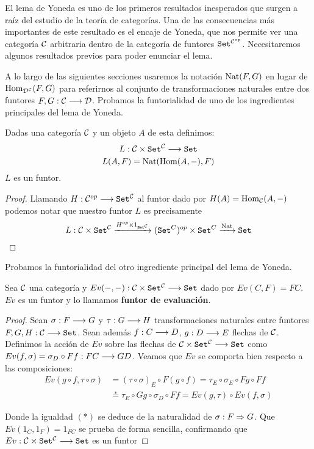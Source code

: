 El lema de Yoneda es uno de los primeros resultados
inesperados que surgen a raíz del
estudio de la teoría de categorías. Una
de las consecuencias más importantes de este resultado es
el encaje de Yoneda, que nos permite
ver una categoría $\mathcal{C}$ arbitraria dentro de la categoría de
funtores $\texttt{Set}^{\mathcal{C}^{op}}$. Necesitaremos algunos resultados
previos para poder enunciar el lema.

A lo largo de las siguientes
secciones usaremos la notación $\operatorname{Nat}(F, G)$ en lugar de
$\operatorname{Hom}_{\mathcal{D}^{\mathcal{C}}}(F, G)$ para referirnos al conjunto de
transformaciones naturales entre dos funtores
$F, G: \mathcal{C}\longrightarrow \mathcal{D}$. Probamos la funtorialidad de uno de los
ingredientes principales del lema de Yoneda.
\begin{proposition*}
  Dadas una categoría $\mathcal{C}$ y un objeto $A$ de esta definimos:
  $$L : \mathcal{C}\times\texttt{Set}^{\mathcal{C}}\longrightarrow \texttt{Set}$$
  $$L(A, F) = \operatorname{Nat}(\operatorname{Hom}(A, -), F)$$
  $L$ es un funtor.
\end{proposition*}
\begin{proof}
  Llamando
  $H: \mathcal{C}^{op}\longrightarrow \texttt{Set}^{\mathcal{C}}$ al funtor dado por
  $H(A) = \operatorname{Hom}_{\mathcal{C}}(A, -)$
  podemos notar que nuestro funtor $L$ es precisamente
  $$L :\mathcal{C}\times\texttt{Set}^{\mathcal{C}}
  \xrightarrow{H^{op}\times 1_{\texttt{Set}^{\mathcal{C}}}}
  (\texttt{Set}^{C})^{op} \times \texttt{Set}^{C}
  \xrightarrow{\operatorname{Nat}} \texttt{Set}$$
\end{proof}
Probamos la funtorialidad
del otro ingrediente principal del lema de Yoneda.
\begin{proposition*}
  Sea $\mathcal{C}$ una categoría y $Ev(-, -) : \mathcal{C}\times\texttt{Set}^{\mathcal{C}}\longrightarrow \texttt{Set}$
  dado por $Ev(C, F) = FC$. $Ev$ es un funtor y lo llamamos
  \textbf{funtor de evaluación}.
\end{proposition*}
\begin{proof}
  Sean $\sigma : F\longrightarrow G$ y $\tau : G\longrightarrow H$ transformaciones naturales entre funtores
  $F, G, H : \mathcal{C}\longrightarrow \texttt{Set}$. Sean además $f : C\longrightarrow D$,
  $g : D\longrightarrow E$ flechas de $\mathcal{C}$.
  Definimos la acción de $Ev$ sobre las flechas de
  $\mathcal{C}\times\texttt{Set}^{\mathcal{C}}\longrightarrow \texttt{Set}$ como
  $Ev(f, \sigma) = \sigma_D \circ Ff : FC\longrightarrow GD$. Veamos que $Ev$ se comporta bien
  respecto a las composiciones:
  \begin{align*}
    Ev(g \circ f, \tau\circ\sigma) &
     = (\tau \circ \sigma)_E\circ F(g\circ f)
     = \tau_E\circ\sigma_E\circ Fg \circ Ff \\
     & \stackrel{*}{=}
  \tau_E\circ Gg \circ\sigma_D \circ Ff
  = Ev(g, \tau) \circ Ev(f, \sigma)
  \end{align*}

  Donde la igualdad $(*)$ se deduce de la
  naturalidad de $\sigma : F\Rightarrow G$.
  Que $Ev(1_C, 1_F) = 1_{FC}$ se prueba de forma sencilla,
  confirmando que $Ev : \mathcal{C}\times\texttt{Set}^{\mathcal{C}}\longrightarrow \texttt{Set}$ es un funtor
\end{proof}

